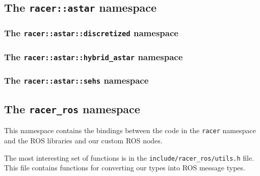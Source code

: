 \subsection{The \texttt{racer::astar} namespace}

\subsubsection{The \texttt{racer::astar::discretized} namespace}

\subsubsection{The \texttt{racer::astar::hybrid\_astar} namespace}

\subsubsection{The \texttt{racer::astar::sehs} namespace}

\subsection{The \texttt{racer\_ros} namespace}

This namespace contains the bindings between the code in the \texttt{racer} namespace and the \gls{ROS} libraries and our custom \gls*{ROS} nodes.

The most interesting set of functions is in the \texttt{include/racer\_ros/utils.h} file. This file contains functions for converting our types into \gls*{ROS} message types.